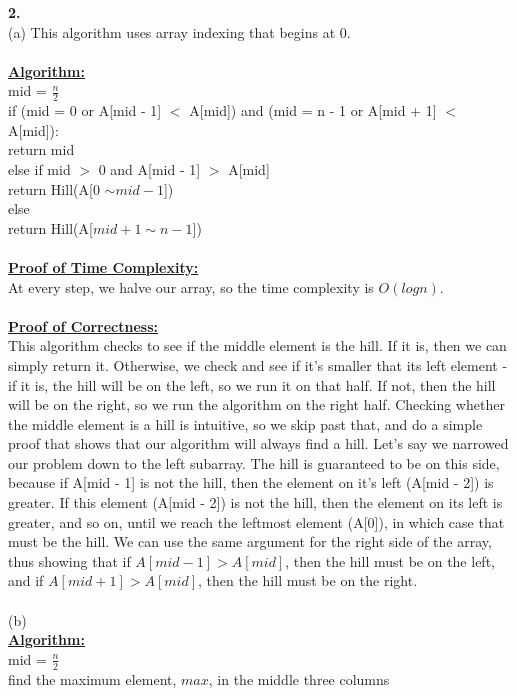 \documentclass[10pt, letterpaper]{report}
\newcommand\tab[1][1cm]{\hspace*{#1}}
\begin{document}
\newpage
\noindent \large{\textbf{2.} } \\
(a) This algorithm uses array indexing that begins at 0.\\
\\
\textbf{\underline{Algorithm:}}\\
mid = \(\frac{n}{2}\)\\
if (mid = 0 or A[mid - 1] $<$ A[mid]) and (mid = n - 1 or A[mid + 1] $<$ A[mid]):\\
\tab return mid\\
else if mid $>$ 0 and A[mid - 1] $>$ A[mid]\\
\tab return Hill(A[0 $\sim mid - 1$])\\
else\\
\tab return Hill(A[$mid + 1 \sim n-1$])\\
\\
\textbf{\underline{Proof of Time Complexity:}}\\
At every step, we halve our array, so the time complexity is $O(logn)$.\\
\\
\textbf{\underline{Proof of Correctness:}}\\
This algorithm checks to see if the middle element is the hill. If it is, then we can simply return it. Otherwise, we check and see if it's smaller that its left element - if it is, the hill will be on the left, so we run it on that half. If not, then the hill will be on the right, so we run the algorithm on the right half. Checking whether the middle element is a hill is intuitive, so we skip past that, and do a simple proof that shows that our algorithm will always find a hill. Let's say we narrowed our problem down to the left subarray. The hill is guaranteed to be on this side, because if A[mid - 1] is not the hill, then the element on it's left (A[mid - 2]) is greater. If this element (A[mid - 2]) is not the hill, then the element on its left is greater, and so on, until we reach the leftmost element (A[0]), in which case that must be the hill. We can use the same argument for the right side of the array, thus showing that if $A[mid - 1] > A[mid]$, then the hill must be on the left, and if $A[mid + 1] > A[mid]$, then the hill must be on the right.\\
\\
(b) \\
\textbf{\underline{Algorithm:}}\\
mid = \(\frac{n}{2}\)\\
find the maximum element, $max$, in the middle three columns\\
\end{document}
